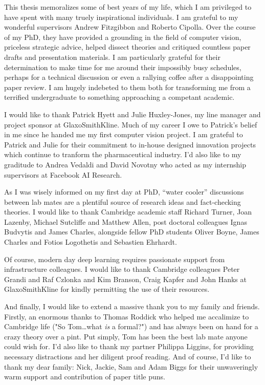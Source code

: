 
\begin{acknowledgements}      


This thesis memoralizes some of best years of my life, which I am privileged to have spent with many truely inspirational individuals. I am grateful to my wonderful supervisors Andrew Fitzgibbon and Roberto Cipolla. Over the course of my PhD, they have provided a grounding in the field of computer vision, priceless strategic advice, helped dissect theories and critiqued countless paper drafts and presentation materials. I am particularly grateful for their determination to make time for me around their impossibly busy schedules, perhaps for a technical discussion or even a rallying coffee after a disappointing paper review. I am hugely indebeted to them both for transforming me from a terrified undergraduate to something approaching a competant academic.

I would like to thank Patrick Hyett and Julie Huxley-Jones, my line manager and project sponsor at GlaxoSmithKline. Much of my career I owe to Patrick's belief in me since he handed me my first computer vision project. I am grateful to Patrick and Julie for their commitment to in-house designed innovation projects which continue to tranform the pharmaceutical industry. I'd also like to my graditude to Andrea Vedaldi and David Novotny who acted as my internship supervisors at Facebook AI Research.  

As I was wisely informed on my first day at PhD, ``water cooler'' discussions between lab mates are a plentiful source of research ideas and fact-checking theories. I would like to thank Cambridge academic staff Richard Turner, Joan Lazenby, Michael Sutcliffe and Matthew Allen, post doctoral colleagues Ignas Budvytis and James Charles, alongside fellow PhD students Oliver Boyne, James Charles and Fotios Logothetis and Sebastien Ehrhardt. 

Of course, modern day deep learning requires passionate support from infrastructure colleagues. I would like to thank Cambridge colleagues Peter Grandi and Raf Czlonka and Kim Branson, Craig Kapfer and John Hanks at GlaxoSmithKline for kindly permitting the use of their resources. 

And finally, I would like to extend a massive thank you to my family and friends. Firstly, an enormous thanks to Thomas Roddick who helped me accalimize to Cambridge life ("So Tom\dots what \emph{is} a formal?") and has always been on hand for a crazy theory over a pint. Put simply, Tom has been the best lab mate anyone could wish for. I'd also like to thank my partner Philippa Liggins, for providing necessary distractions and her diligent proof reading. And of course, I'd like to thank my dear family: Nick, Jackie, Sam and Adam Biggs for their unwaveringly warm support and contribution of paper title puns.


\end{acknowledgements}
